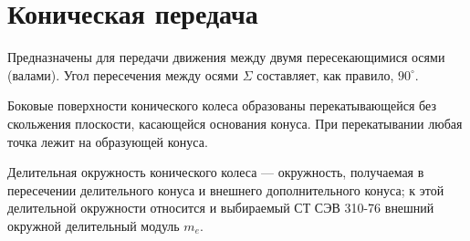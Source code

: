\chapter{Коническая передача}
\label{ch:conic}

Предназначены для передачи движения между двумя пересекающимися осями (валами). Угол пересечения между осями $ \Sigma $ составляет, как правило, $ 90^\circ $.

Боковые поверхности конического колеса образованы перекатывающейся без скольжения плоскости, касающейся основания конуса. При перекатывании любая точка лежит на образующей конуса.

Делительная окружность конического колеса --- окружность, получаемая в пересечении делительного конуса и внешнего дополнительного конуса; к этой делительной окружности относится и выбираемый СТ СЭВ 310-76 внешний окружной делительный модуль $ m_e $. 